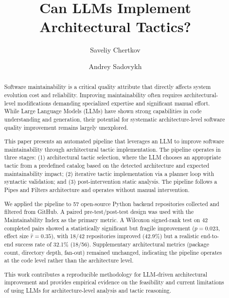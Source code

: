 \documentclass[sigconf,review,anonymous]{acmart}
\begin{document}
\title{Can LLMs Implement Architectural Tactics?}

\author{Saveliy Chertkov}

\author{Andrey Sadovykh}

\begin{abstract}

Software maintainability is a critical quality attribute that directly affects system evolution cost and reliability. Improving maintainability often requires architectural-level modifications demanding specialized expertise and significant manual effort. While Large Language Models (LLMs) have shown strong capabilities in code understanding and generation, their potential for systematic architecture-level software quality improvement remains largely unexplored.

This paper presents an automated pipeline that leverages an LLM to improve software maintainability through architectural tactic implementation. The pipeline operates in three stages: (1) architectural tactic selection, where the LLM chooses an appropriate tactic from a predefined catalog based on the detected architecture and expected maintainability impact; (2) iterative tactic implementation via a planner loop with syntactic validation; and (3) post-intervention static analysis. The pipeline follows a Pipes and Filters architecture and operates without manual intervention.

We applied the pipeline to 57 open-source Python backend repositories collected and filtered from GitHub. A paired pre-test/post-test design was used with the Maintainability Index as the primary metric. A Wilcoxon signed-rank test on 42 completed pairs showed a statistically significant but fragile improvement ($p = 0.023$, effect size $\hat{r} = 0.35$), with 18/42 repositories improved (42.9\%) but a realistic end-to-end success rate of 32.1\% (18/56). Supplementary architectural metrics (package count, directory depth, fan-out) remained unchanged, indicating the pipeline operates at the code level rather than the architecture level.

This work contributes a reproducible methodology for LLM-driven architectural improvement and provides empirical evidence on the feasibility and current limitations of using LLMs for architecture-level analysis and tactic reasoning.

\end{abstract}
\end{document}
